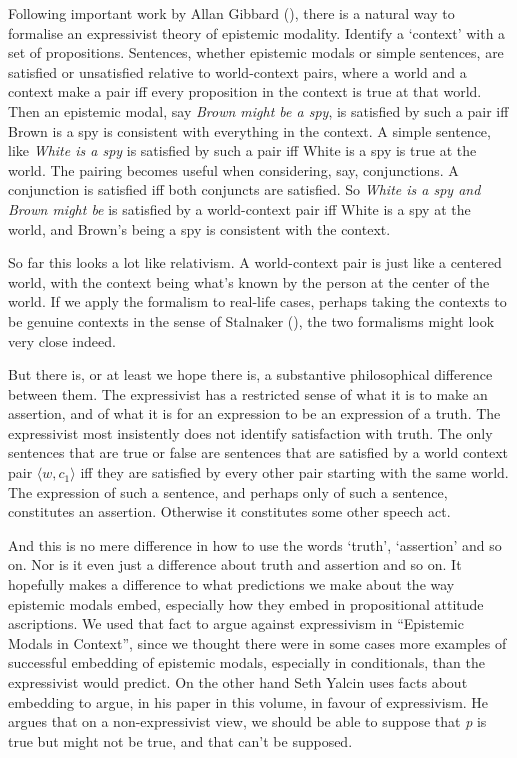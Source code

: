 \documentclass[
  11pt,
  letterpaper,
  DIV=11,
  numbers=noendperiod,
  twoside]{scrartcl}
\begin{document}
Following important work by Allan Gibbard
(), there is a natural way to formalise
an expressivist theory of epistemic modality. Identify a `context' with
a set of propositions. Sentences, whether epistemic modals or simple
sentences, are satisfied or unsatisfied relative to world-context pairs,
where a world and a context make a pair iff every proposition in the
context is true at that world. Then an epistemic modal, say \emph{Brown
might be a spy}, is satisfied by such a pair iff Brown is a spy is
consistent with everything in the context. A simple sentence, like
\emph{White is a spy} is satisfied by such a pair iff White is a spy is
true at the world. The pairing becomes useful when considering, say,
conjunctions. A conjunction is satisfied iff both conjuncts are
satisfied. So \emph{White is a spy and Brown might be} is satisfied by a
world-context pair iff White is a spy at the world, and Brown's being a
spy is consistent with the context.

So far this looks a lot like relativism. A world-context pair is just
like a centered world, with the context being what's known by the person
at the center of the world. If we apply the formalism to real-life
cases, perhaps taking the contexts to be genuine contexts in the sense
of Stalnaker (), the two formalisms
might look very close indeed.

But there is, or at least we hope there is, a substantive philosophical
difference between them. The expressivist has a restricted sense of what
it is to make an assertion, and of what it is for an expression to be an
expression of a truth. The expressivist most insistently does not
identify satisfaction with truth. The only sentences that are true or
false are sentences that are satisfied by a world context pair
\(\langle w,c_1 \rangle\) iff they are satisfied by every other pair
starting with the same world. The expression of such a sentence, and
perhaps only of such a sentence, constitutes an assertion. Otherwise it
constitutes some other speech act.

And this is no mere difference in how to use the words `truth',
`assertion' and so on. Nor is it even just a difference about truth and
assertion and so on. It hopefully makes a difference to what predictions
we make about the way epistemic modals embed, especially how they embed
in propositional attitude ascriptions. We used that fact to argue
against expressivism in ``Epistemic Modals in Context'', since we
thought there were in some cases more examples of successful embedding
of epistemic modals, especially in conditionals, than the expressivist
would predict. On the other hand Seth Yalcin uses facts about embedding
to argue, in his paper in this volume, in favour of expressivism. He
argues that on a non-expressivist view, we should be able to suppose
that \emph{p} is true but might not be true, and that can't be supposed.
\end{document}
